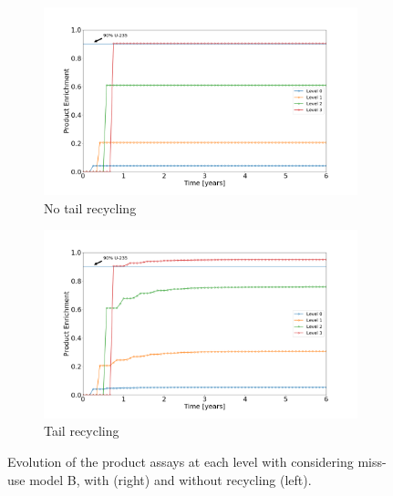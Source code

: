 \begin{figure}[t!]
    \centering
    \begin{subfigure}[t]{0.45\textwidth}
        \centering
        \includegraphics[scale=0.18]{NR_case2}
        \caption{No tail recycling}
    \end{subfigure}%
    \begin{subfigure}[t]{0.45\textwidth}
        \centering
        \includegraphics[scale=0.18]{R_case2}
        \caption{Tail recycling}
    \end{subfigure}
    \caption{Evolution of the product assays at each level with considering
    miss-use model B, with (right) and without recycling (left).}
\end{figure}
